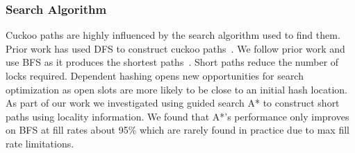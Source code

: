 



\subsubsection{Search Algorithm} 

Cuckoo paths are highly influenced by the search algorithm 
used to find them. Prior work has used DFS to construct 
cuckoo paths~\cite{pilaf,memc3}. We follow prior work and 
use BFS as it produces the shortest 
paths~\cite{cuckoo-improvements}. Short paths reduce the 
number of locks required. Dependent hashing opens new 
opportunities for search optimization as open slots are more
likely to be close to an initial hash location. As part of
our work we investigated using guided search A* to construct
short paths using locality information. We found that A*'s
performance only improves on BFS at fill rates about 95\%
which are rarely found in practice due to max fill rate
limitations.

